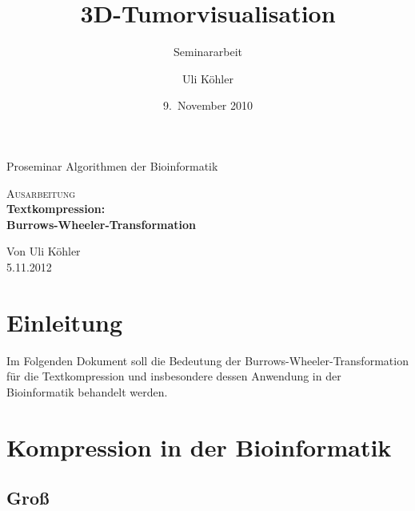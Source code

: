 \documentclass[ngerman,pdftex,paper=A4,DIV=calc,titlepage,12pt]{scrartcl}
\title{3D-Tumorvisualisation}
\subtitle{Seminararbeit}
\author{Uli Köhler}
\date{9.~November 2010}
\newtheorem[L]{boxedDefinition}{Definition}
\begin{document}
\begin{titlepage}
\begin{center}
 Proseminar \glqq Algorithmen der Bioinformatik\grqq
 \end{center}
\vspace{4cm}
\begin{center}
  
 \large\textsc{Ausarbeitung}\\[5mm]
 {\Huge\centering\bfseries\selectfont Textkompression:\\Burrows-Wheeler-Transformation}\\[2cm]
\begin{center}
  Von Uli Köhler\\
  5.11.2012
\end{center}
\vspace{2cm}
\end{center}
\end{titlepage}
\thispagestyle{empty}\newpage %
\tableofcontents\thispagestyle{empty}\newpage 
\section{Einleitung}
Im Folgenden Dokument soll die Bedeutung der Burrows-Wheeler-Transformation für die Textkompression und insbesondere dessen Anwendung in der Bioinformatik behandelt werden.
\section{Kompression in der Bioinformatik}
\subsection{Groß}
\end{document}
